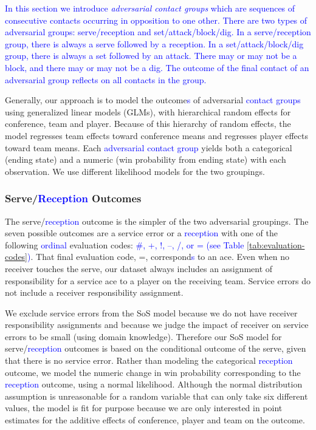 \documentclass[USenglish]{article}
\theoremstyle{dgthm}
\theoremstyle{dgdef}
\begin{document}
\textcolor{blue}{
In this section we introduce {\it adversarial contact groups} which are sequences of consecutive contacts occurring in opposition to one other. There are two types of adversarial groups: serve/reception and set/attack/block/dig. In a serve/reception group, there is always a serve followed by a reception. In a set/attack/block/dig group, there is always a set followed by an attack. There may or may not be a block, and there may or may not be a dig. The outcome of the final contact of an adversarial group reflects on all contacts in the group.
}

Generally, our approach is to model the outcome\textcolor{blue}{s} of adversarial \textcolor{blue}{contact groups} using generalized linear models (GLMs), with hierarchical random effects for conference, team and player. Because of this hierarchy of random effects, the model regresses team effects toward conference means and regresses player effects toward team means. Each \textcolor{blue}{adversarial contact group} yields both a categorical (ending state) and a numeric (win probability from ending state) with each observation. We use different likelihood models for the two groupings.

\subsubsection{Serve/\textcolor{blue}{Reception} Outcomes}

The serve/\textcolor{blue}{reception} outcome is the simpler of the two adversarial groupings. The seven possible outcomes are a service error or a \textcolor{blue}{reception} with one of the following \textcolor{blue}{ordinal} evaluation codes: \textcolor{blue}{\#, +, !, --, /, or = (see Table \ref{tab:evaluation-codes})}. That final evaluation code, =, correspond\textcolor{blue}{s} to an ace. Even when no receiver touches the serve, our dataset always includes an assignment of responsibility for a service ace to a player on the receiving team. Service errors do not include a receiver responsibility assignment.

We exclude service errors from the SoS model because we do not have receiver responsibility assignments and because we judge the impact of receiver on service errors to be small (using domain knowledge). Therefore our SoS model for serve/\textcolor{blue}{reception} outcomes is based on the conditional outcome of the serve, given that there is no service error. Rather than modeling the categorical \textcolor{blue}{reception} outcome, we model the numeric change in win probability corresponding to the \textcolor{blue}{reception} outcome, using a normal likelihood. Although the normal distribution assumption is unreasonable for a random variable that can only take six different values, the model is fit for purpose because we are only interested in point estimates for the additive effects of conference, player and team on the outcome.
\end{document}
